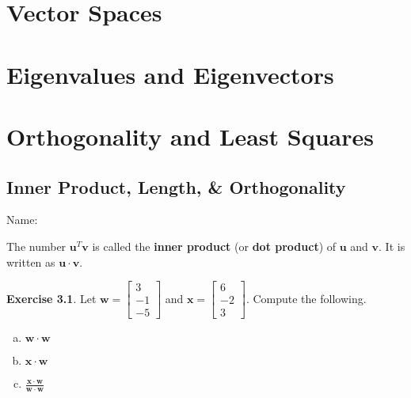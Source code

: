 \documentclass[10pt]{book}
\newcommand{\boxcolor}{gray!30}
\newenvironment{boxdef}{\begin{mdframed}[backgroundcolor=\boxcolor,linewidth=0pt,nobreak=true]}{\end{mdframed}}
\theoremstyle{definition}
\newtheorem{exercise}{Exercise}[section]
\newcommand{\name}[1][2.5in]{\vspace{-2.3em}\hfill Name: \underline{\hspace{#1}}}
\newcommand{\vect}[1]{\ensuremath{\boldsymbol{\mathbf{#1}}}}
\begin{document}


\chapter{Vector Spaces}
\setcounter{section}{0}




\chapter{Eigenvalues and Eigenvectors}
\setcounter{section}{0}



\chapter{Orthogonality and Least Squares}
\setcounter{section}{0}

\section[Inner Prod., Length, \& Orth.]{Inner Product, Length, \& Orthogonality}
\name[1.5in]


\begin{boxdef}
	The number $\vect{u}^T\vect{v}$ is called the \textbf{inner product} (or \textbf{dot product}) of $\vect{u}$ and $\vect{v}$. It is written as $\vect{u}\cdot\vect{v}$.
\end{boxdef}


\begin{exercise} %
	Let $\vect{w}=\begin{bmatrix}3\\-1\\-5\end{bmatrix}$ and $\vect{x}=\begin{bmatrix}6\\-2\\3\end{bmatrix}$. Compute the following.
	\begin{multicols}{2}
		\begin{enumerate}[(a)]
			\item $\vect{w}\cdot\vect{w}$
			\vspace{5em}
			\item $\vect{x}\cdot\vect{w}$
			\columnbreak
			\item $\frac{\vect{x}\cdot\vect{w}}{\vect{w}\cdot\vect{w}}$
		\end{enumerate}
	\end{multicols}
	\vspace{5em}
\end{exercise}
\end{document}
